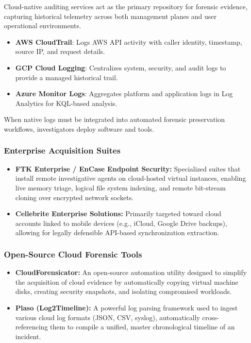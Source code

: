 \noindent
Cloud-native auditing services act as the primary repository for forensic evidence, capturing historical telemetry across both management planes and user operational environments.

\begin{itemize}
    \item \textbf{AWS CloudTrail}: Logs AWS API activity with caller identity, timestamp, source IP, and request details.
    \item \textbf{GCP Cloud Logging}: Centralizes system, security, and audit logs to provide a managed historical trail.
    \item \textbf{Azure Monitor Logs}: Aggregates platform and application logs in Log Analytics for KQL-based analysis.
\end{itemize}

\noindent
When native logs must be integrated into automated forensic preservation workflows, investigators deploy software and tools.

\subsubsection*{Enterprise Acquisition Suites}
\begin{itemize}
    \item \textbf{FTK Enterprise / EnCase Endpoint Security:} Specialized suites that install remote investigative agents on cloud-hosted virtual instances, enabling live memory triage, logical file system indexing, and remote bit-stream cloning over encrypted network sockets.
    \item \textbf{Cellebrite Enterprise Solutions:} Primarily targeted toward cloud accounts linked to mobile devices (e.g., iCloud, Google Drive backups), allowing for legally defensible API-based synchronization extraction.
\end{itemize}

\subsubsection*{Open-Source Cloud Forensic Tools}
\begin{itemize}
    \item \textbf{CloudForensicator:} An open-source automation utility designed to simplify the acquisition of cloud evidence by automatically copying virtual machine disks, creating security snapshots, and isolating compromised workloads.
    \item \textbf{Plaso (Log2Timeline):} A powerful log parsing framework used to ingest various cloud log formats (JSON, CSV, syslog), automatically cross-referencing them to compile a unified, master chronological timeline of an incident.
\end{itemize}